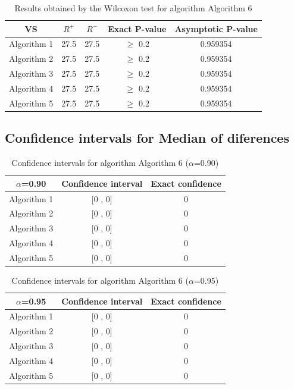 \documentclass[a4paper,10pt]{article}
\begin{document}
\begin{table}[!htp]
\centering\small
\begin{tabular}{
|c|c|c|c|c|}
\hline
 VS & $R^{+}$ & $R^{-}$ & Exact P-value & Asymptotic P-value \\ \hline 
Algorithm 1 & 27.5 & 27.5 & $\geq$ 0.2 & 0.959354\\ \hline 
Algorithm 2 & 27.5 & 27.5 & $\geq$ 0.2 & 0.959354\\ \hline 
Algorithm 3 & 27.5 & 27.5 & $\geq$ 0.2 & 0.959354\\ \hline 
Algorithm 4 & 27.5 & 27.5 & $\geq$ 0.2 & 0.959354\\ \hline 
Algorithm 5 & 27.5 & 27.5 & $\geq$ 0.2 & 0.959354\\ \hline 

\end{tabular}
\caption{Results obtained by the Wilcoxon test for algorithm Algorithm 6}
\end{table}

\subsection{Confidence intervals for Median of diferences}

\begin{table}[!htp]
\centering\small
\begin{tabular}{
|c|c|c|}
\hline
 $\alpha$=0.90 & Confidence interval & Exact confidence \\ \hline 
Algorithm 1 & [0 , 0] & 0\\ \hline 
Algorithm 2 & [0 , 0] & 0\\ \hline 
Algorithm 3 & [0 , 0] & 0\\ \hline 
Algorithm 4 & [0 , 0] & 0\\ \hline 
Algorithm 5 & [0 , 0] & 0\\ \hline 

\end{tabular}
\caption{Confidence intervals for algorithm Algorithm 6 ($\alpha$=0.90)}
\end{table}
\begin{table}[!htp]
\centering\small
\begin{tabular}{
|c|c|c|}
\hline
 $\alpha$=0.95 & Confidence interval & Exact confidence \\ \hline 
Algorithm 1 & [0 , 0] & 0\\ \hline 
Algorithm 2 & [0 , 0] & 0\\ \hline 
Algorithm 3 & [0 , 0] & 0\\ \hline 
Algorithm 4 & [0 , 0] & 0\\ \hline 
Algorithm 5 & [0 , 0] & 0\\ \hline 

\end{tabular}
\caption{Confidence intervals for algorithm Algorithm 6 ($\alpha$=0.95)}
\end{table}

 \clearpage 
\end{document}
